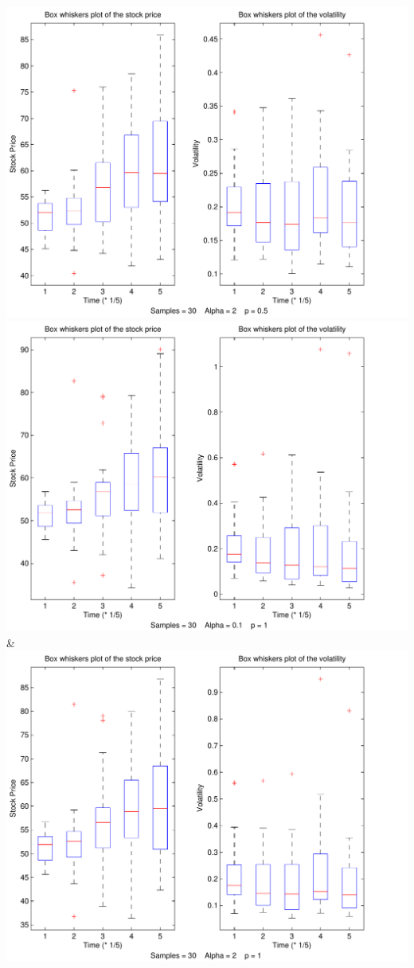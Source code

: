\documentclass[a4paper,onecolumn]{IEEEtran}
\begin{document}
{			 \includegraphics[width=\stockplotsize]{box_s30_a2_p0-5}\NN\cmidrule(lr){1-2}
		 \includegraphics[width=\stockplotsize]{box_s30_a0-1_p1}&
			 \includegraphics[width=\stockplotsize]{box_s30_a2_p1}\NN\cmidrule(lr){1-2}
}
\end{document}
